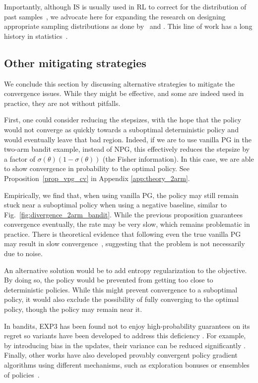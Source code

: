 Importantly, although IS is usually used in RL to correct for the distribution of past samples~\citep[e.g.,][]{munos16retrace}, we advocate here for expanding the research on designing appropriate sampling distributions as done by~\citet{hanna2017data, hanna2018importance} and \citet{parmas2019unified}. This line of work has a long history in statistics~\citep[c.f.,][]{liu2008monte}. 

\subsection{Other mitigating strategies}
We conclude this section by discussing alternative strategies to mitigate the convergence issues. While they might be effective, and some are indeed used in practice, they are not without pitfalls.

First, one could consider reducing the stepsizes, with the hope that the policy would not converge as quickly towards a suboptimal deterministic policy and would eventually leave that bad region. Indeed, if we are to use vanilla PG in the two-arm bandit example, instead of NPG, this effectively reduces the stepsize by a factor of $\sigma(\theta)(1-\sigma(\theta))$ (the Fisher information). In this case, we are able to show convergence in probability to the optimal policy. See Proposition~\ref{prop_vpg_cv} in Appendix \ref{app:theory_2arm}.

Empirically, we find that, when using vanilla PG, the policy may still remain stuck near a suboptimal policy when using a negative baseline, similar to Fig.~\ref{fig:divergence_2arm_bandit}. While the previous proposition guarantees convergence eventually, the rate may be very slow, which remains problematic in practice. There is theoretical evidence that following even the true vanilla PG may result in slow convergence~\citep{schaul2019ray}, suggesting that the problem is not necessarily due to noise.

An alternative solution would be to add entropy regularization to the objective. By doing so, the policy would be prevented from getting too close to deterministic policies. While this might prevent convergence to a suboptimal policy, it would also exclude the possibility of fully converging to the optimal policy, though the policy may remain near it.

In bandits, EXP3 has been found not to enjoy high-probability guarantees on its regret so variants have been developed to address this deficiency \citep[c.f.][]{lattimore_szepesvari_2020}. For example, by introducing bias in the updates, their variance can be reduced significantly \cite{auer2002nonstochastic, neu2015explore}.
Finally, other works have also developed provably convergent policy gradient algorithms using different mechanisms, such as exploration bonuses or ensembles of policies~\citep{cai2019provably, efroni2020optimistic, agarwal2020pc}. 


